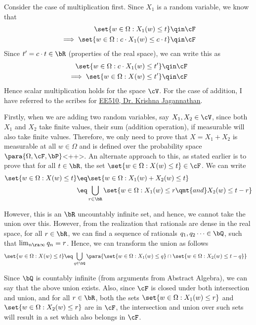 \documentclass[a4paper,10pt]{article}
\begin{document}
\begin{question}
	Consider the case of multiplication first.
	Since $X_1$ is a random variable, we know that
	\begin{align*}
		\set{w \in \Omega: X_1(w) \le t}			&\qin	\cF \\
		\implies \set{w \in \Omega: c \cdot X_1(w) \le c \cdot t}	&\qin	\cF \\
	\end{align*}
	Since $t' = c \cdot t \in \bR$ (properties of the real space), we can write this as
	\begin{align*}
		\set{w \in \Omega: c \cdot X_1(w) \le t'}	&\qin	\cF \\
		\implies \set{w \in \Omega: X(w) \le t'}	&\qin	\cF
	\end{align*}
	Hence scalar multiplication holds for the space $\cV$.
	For the case of addition, I have referred to the scribes for \href{http://nptel.ac.in/courses/108106083/lecture15_Sums_of_RVs.pdf}{EE510, Dr. Krishna Jagannathan}.

	Firstly, when we are adding two random variables, say $X_1, X_2 \in \cV$, since both $X_1$ and $X_2$ take finite values, their sum (addition operation), if measurable will also take finite values. Therefore, we only need to prove that $X = X_1 + X_2$ is measurable at all $w \in \Omega$ and is defined over the probability space $\para{\Omega, \cF, \bP}$<++>. An alternate approach to this, as stated earlier is to prove that for all $t \in \bR$, the set $\set{w \in \Omega: X(w) \le t} \in \cF$. We can write
	\begin{align*}
		\set{w \in \Omega: X(w) \le t}	&\eq	\set{w \in \Omega: X_1(w) + X_2(w) \le t} \\
		&\eq	\bigcup_{r \in \bR} \set{w \in \Omega: X_1(w) \le r \qmt{and} X_2(w) \le t - r}
	\end{align*}

	However, this is an $\bR$ uncountably infinite set, and hence, we cannot take the union over this. However, from the realization that rationals are dense in the real space, \ie for all $r \in \bR$, we can find a sequence of rationals $q_1, q_2 \dots \in \bQ$, such that $\lim_{n \ra \infty} q_n = r$. Hence, we can transform the union as follows
	\begin{align*}
		\set{w \in \Omega: X(w) \le t}	&\eq	\bigcup_{q \in \bQ} \para{\set{w \in \Omega: X_1(w) \le q} \cap \set{w \in \Omega: X_2(w) \le t - q}}
	\end{align*}

	Since $\bQ$ is countably infinite (from arguments from Abstract Algebra), we can say that the above union exists. Also, since $\cF$ is closed under both intersection and union, and for all $r \in \bR$, both the sets $\set{w \in \Omega: X_1(w) \le r}$ and $\set{w \in \Omega: X_2(w) \le r}$ are in $\cF$, the intersection and union over such sets will result in a set which also belongs in $\cF$.


\end{question}
\end{document}
